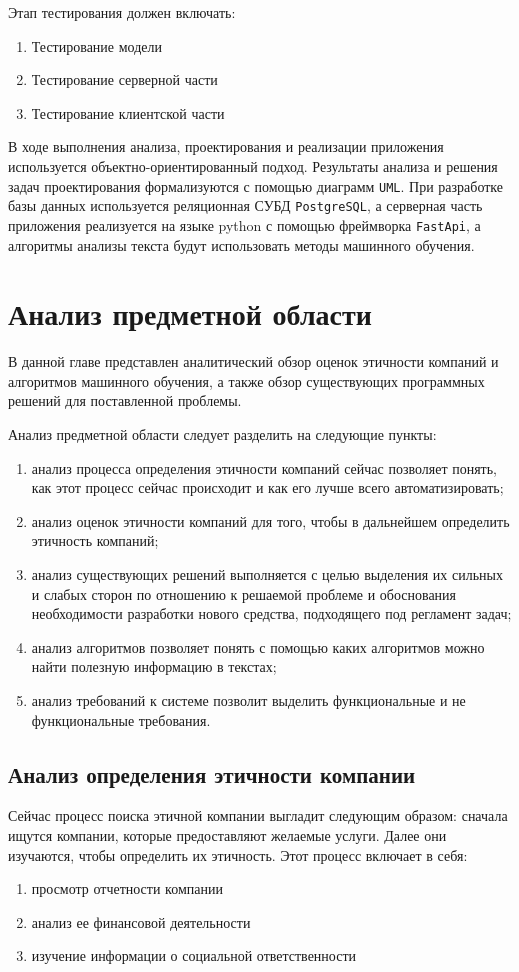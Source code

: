 \documentclass[PI, VKR]{HSEUniversity}
\begin{document}
Этап тестирования должен включать:
\begin{enumerate}
\item Тестирование модели
\item Тестирование серверной части
\item Тестирование клиентской части
\end{enumerate}

В ходе выполнения анализа, проектирования и реализации приложения используется объектно-ориентированный подход. Результаты анализа и решения задач проектирования формализуются с помощью диаграмм \texttt{UML}. При разработке базы данных используется реляционная СУБД \texttt{PostgreSQL}, а серверная часть приложения реализуется на языке python с помощью фреймворка \texttt{FastApi}, а алгоритмы анализы текста будут использовать методы машинного обучения.
\chapter{Анализ предметной области}
\label{sec:org70eb887}
В данной главе представлен аналитический обзор оценок этичности компаний и алгоритмов машинного обучения, а также обзор существующих программных решений для поставленной проблемы.

Анализ предметной области следует разделить на следующие пункты:
\begin{enumerate}
\item анализ процесса определения этичности компаний сейчас позволяет понять, как этот процесс сейчас происходит и как его лучше всего автоматизировать;
\item анализ оценок этичности компаний для того, чтобы в дальнейшем определить этичность компаний;
\item анализ существующих решений выполняется с целью выделения их сильных и слабых сторон по отношению к решаемой проблеме и обоснования необходимости разработки нового средства, подходящего под регламент задач;
\item анализ алгоритмов позволяет понять с помощью каких алгоритмов можно найти полезную информацию в текстах;
\item анализ требований к системе позволит выделить функциональные и не функциональные требования.
\end{enumerate}
\section{Анализ определения этичности компании}
\label{sec:org13daa1f}
Сейчас процесс поиска этичной компании выгладит следующим образом: сначала ищутся компании, которые предоставляют желаемые услуги. Далее они изучаются, чтобы определить их этичность. Этот процесс включает в себя:
\begin{enumerate}
\item просмотр отчетности компании
\item анализ ее финансовой деятельности
\item изучение информации о социальной ответственности
\end{enumerate}
\end{document}
